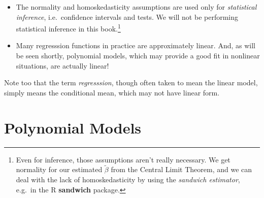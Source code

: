 \begin{itemize}

\item The normality and homoskedasticity assumptions are used only for
\textit{statistical inference}, i.e.\ confidence intervals and tests.
We will not be performing statistical inference in this
book.\footnote{Even for inference, those assumptions aren't really
necessary.  We get normality for our estimated $\widetilde{\beta}$ from
the Central Limit Theorem, and we can deal with the lack of
homoskedasticity by using the \textit{sandwich estimator}, e.g.\ in the
R \textbf{sandwich} package.} 

\item Many regresssion functions in practice are approximately linear.
And, as will be seen shortly, polynomial models, which may provide a
good fit in nonlinear situations, are actually linear!

\end{itemize} 

Note too that the term \textit{regresssion}, though often taken to mean
the linear model, simply means the conditional mean, which may not have
linear form.

\section{Polynomial Models}


